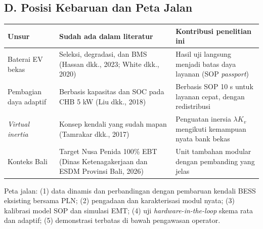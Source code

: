 \documentclass[12pt,a4paper,twocolumn]{article}
\newcommand{\eng}[1]{\textit{#1}}
\begin{document}
\subsection*{D. Posisi Kebaruan dan Peta Jalan}
\begin{center}
\small
\begin{tabular}{|p{3.2cm}|p{6.2cm}|p{6.8cm}|}
\hline
\textbf{Unsur} & \textbf{Sudah ada dalam literatur} & \textbf{Kontribusi penelitian ini} \\
\hline
Baterai EV bekas & Seleksi, degradasi, dan BMS (Hassan dkk., 2023; White dkk., 2020) & Hasil uji langsung menjadi batas daya layanan (SOP \eng{passport}) \\
\hline
Pembagian daya adaptif & Berbasis kapasitas dan SOC pada CHB 5 kW (Liu dkk., 2018) & Berbasis SOP 10 s untuk layanan cepat, dengan redistribusi \\
\hline
\eng{Virtual inertia} & Konsep kendali yang sudah mapan (Tamrakar dkk., 2017) & Penguatan inersia $\lambda K_v$ mengikuti kemampuan nyata bank bekas \\
\hline
Konteks Bali & Target Nusa Penida 100\% EBT (Dinas Ketenagakerjaan dan ESDM Provinsi Bali, 2026) & Unit tambahan modular dengan pembanding yang jelas \\
\hline
\end{tabular}
\end{center}
Peta jalan: (1) data dinamis dan perbandingan dengan pembaruan kendali BESS eksisting bersama PLN; (2) pengadaan dan karakterisasi modul nyata; (3) kalibrasi model SOP dan simulasi EMT; (4) uji \eng{hardware-in-the-loop} skema rata dan adaptif; (5) demonstrasi terbatas di bawah pengawasan operator.
\end{document}
